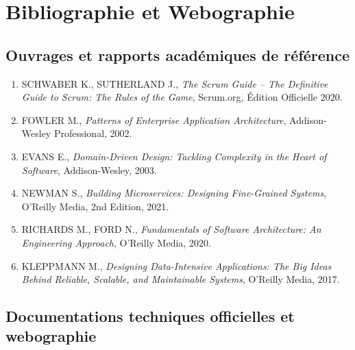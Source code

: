 \chapter*{Bibliographie et Webographie}

\section*{Ouvrages et rapports académiques de référence}

\begin{enumerate}
    \item SCHWABER K., SUTHERLAND J., \textit{The Scrum Guide -- The Definitive Guide to Scrum: The Rules of the Game}, Scrum.org, Édition Officielle 2020.
    \item FOWLER M., \textit{Patterns of Enterprise Application Architecture}, Addison-Wesley Professional, 2002.
    \item EVANS E., \textit{Domain-Driven Design: Tackling Complexity in the Heart of Software}, Addison-Wesley, 2003.
    \item NEWMAN S., \textit{Building Microservices: Designing Fine-Grained Systems}, O'Reilly Media, 2nd Edition, 2021.
    \item RICHARDS M., FORD N., \textit{Fundamentals of Software Architecture: An Engineering Approach}, O'Reilly Media, 2020.
    \item KLEPPMANN M., \textit{Designing Data-Intensive Applications: The Big Ideas Behind Reliable, Scalable, and Maintainable Systems}, O'Reilly Media, 2017.
\end{enumerate}

\section*{Documentations techniques officielles et webographie}

